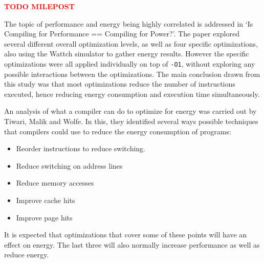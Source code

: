 \documentclass[twocolumn]{article}
\newcommand{\todo}[1]{\textbf{\textcolor{red}{#1}}}
\begin{document}

\todo{TODO MILEPOST}

The topic of performance and energy being highly correlated is addressed in `Is Compiling for Performance == Compiling for Power?'\cite{CompilingForPerformancePower}. The paper explored several different overall optimization levels, as well as four specific optimizations, also using the Wattch simulator to gather energy results. However the specific optimizations were all applied individually on top of \texttt{-O1}, without exploring any possible interactions between the optimizations. The main conclusion drawn from this study was that most optimizations reduce the number of instructions executed, hence reducing energy consumption and execution time simultaneously.

An analysis of what a compiler can do to optimize for energy was carried out by Tiwari, Malik and Wolfe\cite{CompilationTechniquesForLowEnergy}. In this, they identified several ways possible techniques that compilers could use to reduce the energy consumption of programs:
\begin{itemize}
	\setlength{\itemsep}{0em}
	\vspace{-1mm}

	\item Reorder instructions to reduce switching.
	\item Reduce switching on address lines
	\item Reduce memory accesses
	\item Improve cache hits
	\item Improve page hits
\end{itemize}

It is expected that optimizations that cover some of these points will have an effect on energy. The last three will also normally increase performance as well as reduce energy.
\end{document}
